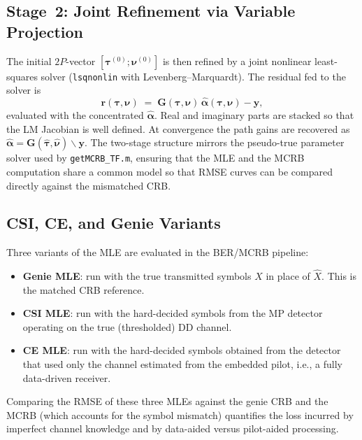 \documentclass[11pt,a4paper]{article}
\begin{document}
\subsection{Stage~2: Joint Refinement via Variable Projection}
The initial $2P$-vector $[\bm\tau^{(0)};\bm\nu^{(0)}]$ is then refined
by a joint nonlinear least-squares solver
(\texttt{lsqnonlin} with Levenberg--Marquardt). The residual fed to
the solver is
\begin{equation}
  \mathbf r(\bm\tau,\bm\nu)
  \;=\; \mathbf G(\bm\tau,\bm\nu)\,\hat{\bm\alpha}(\bm\tau,\bm\nu) - \mathbf y,
\end{equation}
evaluated with the concentrated $\hat{\bm\alpha}$. Real and imaginary
parts are stacked so that the LM Jacobian is well defined. At
convergence the path gains are recovered as
$\hat{\bm\alpha} = \mathbf G(\hat{\bm\tau},\hat{\bm\nu})\backslash \mathbf y$.
The two-stage structure mirrors the pseudo-true parameter solver used
by \texttt{getMCRB\_TF.m}, ensuring that the MLE and the MCRB
computation share a common model so that RMSE curves can be compared
directly against the mismatched CRB.

\subsection{CSI, CE, and Genie Variants}
Three variants of the MLE are evaluated in the BER/MCRB pipeline:
\begin{itemize}
  \item \textbf{Genie MLE}: run with the true transmitted symbols
        $X$ in place of $\hat X$. This is the matched CRB reference.
  \item \textbf{CSI MLE}: run with the hard-decided symbols from the
        MP detector operating on the true (thresholded) DD channel.
  \item \textbf{CE MLE}: run with the hard-decided symbols obtained
        from the detector that used only the channel estimated from
        the embedded pilot, i.e., a fully data-driven receiver.
\end{itemize}
Comparing the RMSE of these three MLEs against the genie CRB and the
MCRB (which accounts for the symbol mismatch) quantifies the loss
incurred by imperfect channel knowledge and by data-aided versus
pilot-aided processing.
\end{document}

